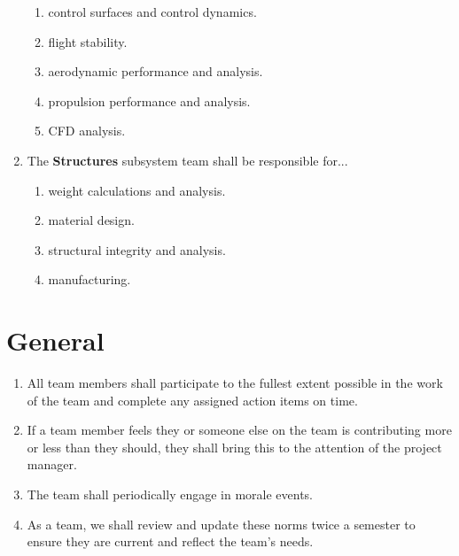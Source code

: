 \begin{enumerate}
\begin{enumerate}
        \item control surfaces and control dynamics.
        \item flight stability.
        \item aerodynamic performance and analysis.
        \item propulsion performance and analysis.
        \item CFD analysis.
    \end{enumerate}
    \item The \textbf{Structures} subsystem team shall be responsible for...
    \begin{enumerate}
        \item weight calculations and analysis.
        \item material design.
        \item structural integrity and analysis.
        \item manufacturing.
    \end{enumerate}
\end{enumerate}

\section{General}

\begin{enumerate}
    \item All team members shall participate to the fullest extent possible in the work of the team and complete any assigned action items on time.
    \item If a team member feels they or someone else on the team is contributing more or less than they should, they shall bring this to the attention of the project manager.
    \item The team shall periodically engage in morale events.
    \item As a team, we shall review and update these norms twice a semester to ensure they are current and reflect the team's needs.
\end{enumerate}
